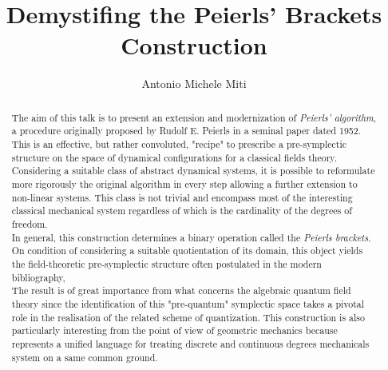\documentclass{article}
\title{Demystifing the Peierls' Brackets Construction}
\author{Antonio Michele Miti}
\date{\vspace{-5ex}} %
\begin{document}
\begin{titlingpage}
    \maketitle
    \begin{abstract}

The aim of this talk is to present an extension and modernization of
         \emph{Peierls' algorithm}, a procedure originally proposed by Rudolf E. Peierls in a seminal paper dated 1952. 
    This is an effective, but rather convoluted, "recipe"  to prescribe a pre-symplectic structure on the space of dynamical configurations for a classical fields theory.
    \\
        Considering a suitable class of  abstract dynamical systems, it is possible to reformulate more rigorously the original algorithm in every step allowing a further extension to non-linear systems.
        This class is not trivial and encompass most of the interesting classical mechanical system
        regardless of which is the cardinality of the degrees of freedom.
        \\
        In general, this construction determines a binary operation called the \emph{Peierls brackets}.
        On condition of considering a suitable quotientation of its domain, this object yields the  field-theoretic pre-symplectic structure often postulated in the modern bibliography, 
        \\
        The result is of great importance from what concerns the algebraic quantum field theory since 
        the identification of this "pre-quantum" symplectic space takes a pivotal role in the realisation of the related scheme of quantization.
       This construction is also particularly interesting from the point of view of geometric mechanics because represents a unified language for treating discrete and continuous degrees mechanicals system on a same common ground.

    \end{abstract}
\end{titlingpage}
\end{document}
